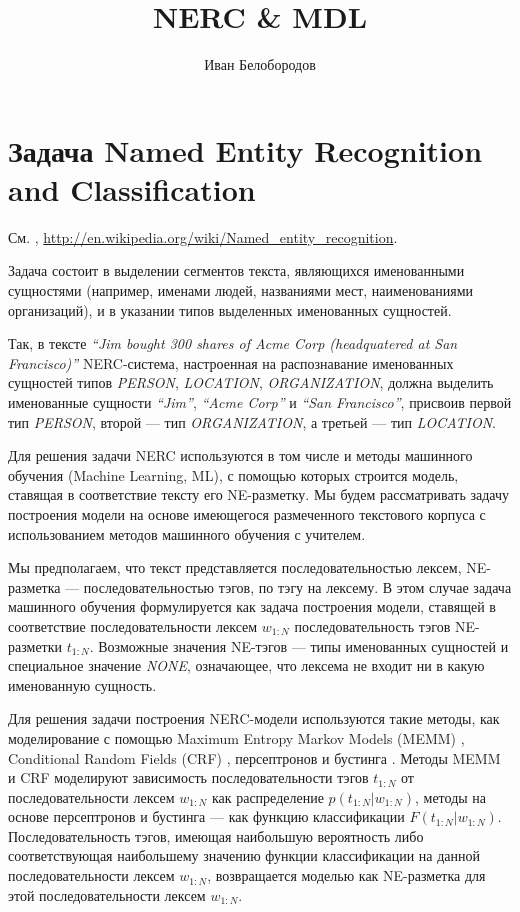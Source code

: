 \documentclass[12pt,a4paper]{article}
\begin{document}
\title{NERC \& MDL}
\author{Иван Белобородов}
\maketitle

\tableofcontents

\setlength{\parskip}{.5\baselineskip}

\section{Задача Named Entity Recognition and Classification}

См. \cite{nadeua2007, ratinov2009},
\url{http://en.wikipedia.org/wiki/Named\_entity\_recognition}.

Задача состоит в выделении сегментов текста, являющихся именованными
сущностями (например, именами людей, названиями мест, наименованиями
организаций), и в указании типов выделенных именованных сущностей.

Так, в тексте \textit{``Jim bought 300 shares of Acme Corp
(headquatered at San Francisco)''}
NERC-система, настроенная на распознавание
именованных сущностей типов
\textit{PERSON}, \textit{LOCATION}, \textit{ORGANIZATION},
должна выделить именованные сущности \textit{``Jim''},
\textit{``Acme Corp''} и
\textit{``San Francisco''},
присвоив первой тип \textit{PERSON}, второй --- тип
\textit{ORGANIZATION}, а третьей --- тип \textit{LOCATION}.

Для решения задачи NERC используются в том числе и методы машинного
обучения (Machine Learning, ML),
с помощью которых строится модель, ставящая в соответствие
тексту его NE-разметку. Мы будем рассматривать задачу построения модели
на основе имеющегося размеченного текстового корпуса с использованием
методов машинного обучения с учителем.

Мы предполагаем, что текст
представляется последовательностью лексем, NE-разметка ---
последовательностью тэгов, по тэгу на лексему. В этом случае задача
машинного обучения формулируется как задача построения модели, ставящей
в соответствие последовательности лексем $w_{1:N}$ последовательность
тэгов NE-разметки $t_{1:N}$. Возможные значения NE-тэгов --- типы
именованных сущностей и специальное значение \textit{NONE},
означающее, что лексема не входит ни в какую именованную сущность.

Для решения задачи построения NERC-модели используются такие методы, как
моделирование с помощью
Maximum Entropy Markov Models (MEMM) \cite{mccallum2000},
Conditional Random Fields (CRF) \cite{lafferty2001}, персептронов и
бустинга \cite{collins2002a, collins2002b}.
Методы MEMM и CRF моделируют зависимость последовательности тэгов
$t_{1:N}$ от последовательности лексем $w_{1:N}$ как распределение
$p(t_{1:N}|w_{1:N})$, методы на основе персептронов и бустинга --- как
функцию классификации $F(t_{1:N}|w_{1:N})$. Последовательность тэгов,
имеющая наибольшую вероятность либо соответствующая наибольшему значению
функции классификации на данной последовательности лексем $w_{1:N}$,
возвращается моделью как NE-разметка для этой последовательности
лексем $w_{1:N}$.
\end{document}
